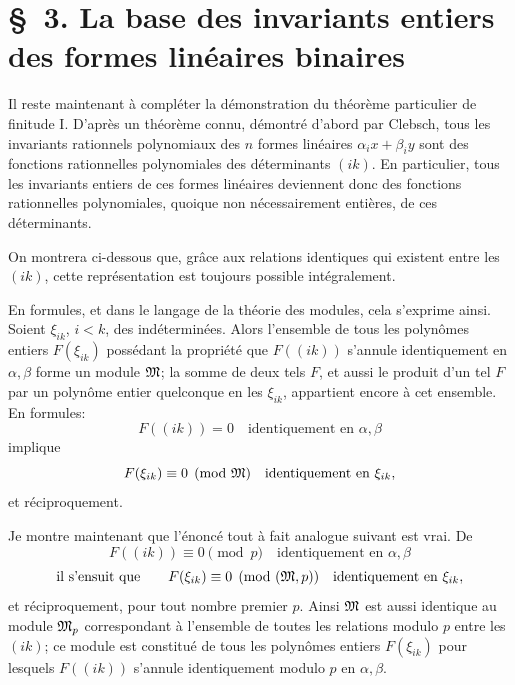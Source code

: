 \setcounter{equation}{0}
\section*{\S\ 3. La base des invariants entiers des formes linéaires binaires}

Il reste maintenant à compléter la démonstration du théorème particulier de finitude I. D'après un théorème connu, démontré d'abord par Clebsch, tous les invariants rationnels polynomiaux des $n$ formes linéaires $\alpha_i x+\beta_i y$ sont des fonctions rationnelles polynomiales des déterminants $(ik)$. En particulier, tous les invariants entiers de ces formes linéaires deviennent donc des fonctions rationnelles polynomiales, quoique non nécessairement entières, de ces déterminants.

On montrera ci-dessous que, grâce aux relations identiques qui existent entre les $(ik)$, cette représentation est toujours possible intégralement.

En formules, et dans le langage de la théorie des modules, cela s'exprime ainsi. Soient $\xi_{ik}$, $i<k$, des indéterminées. Alors l'ensemble de tous les polynômes entiers $F(\xi_{ik})$ possédant la propriété que $F((ik))$ s'annule identiquement en $\alpha,\beta$ forme un module $\mathfrak M$; la somme de deux tels $F$, et aussi le produit d'un tel $F$ par un polynôme entier quelconque en les $\xi_{ik}$, appartient encore à cet ensemble. En formules:
\[
        F((ik))=0\quad \text{identiquement en $\alpha,\beta$}
\]
implique
\[
        F(\xi_{ik})\equiv0\pmod{\mathfrak M}\quad \text{identiquement en $\xi_{ik}$},
\]
et réciproquement.

Je montre maintenant que l'énoncé tout à fait analogue suivant est vrai. De
\[
        F((ik))\equiv0\pmod p\quad \text{identiquement en $\alpha,\beta$}
\]
\begin{equation}
        \text{il s'ensuit que}\qquad
        F(\xi_{ik})\equiv0\pmod{(\mathfrak M,p)}
        \quad \text{identiquement en $\xi_{ik}$},
\end{equation}
et réciproquement, pour tout nombre premier $p$. Ainsi $\mathfrak M$ est aussi identique au module $\mathfrak M_p$ correspondant à l'ensemble de toutes les relations modulo $p$ entre les $(ik)$; ce module est constitué de tous les polynômes entiers $F(\xi_{ik})$ pour lesquels $F((ik))$ s'annule identiquement modulo $p$ en $\alpha,\beta$.

